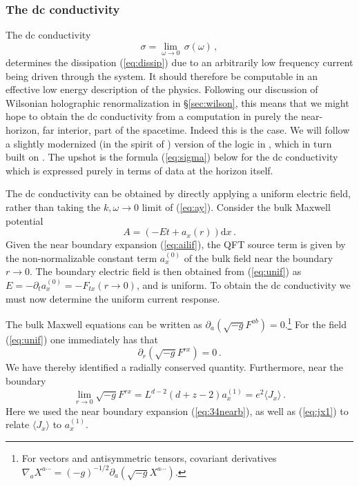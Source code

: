 \documentclass[10pt, oneside]{book}
\let\pa=\partial
\def\be{\begin{equation}}
\def\ee{\end{equation}}
\begin{document}
\begin{doublespace}
\subsubsection{The dc conductivity}
\label{sec:dccond}

The dc conductivity
\be
\sigma = \lim_{\omega \to 0} \, \sigma(\omega) \,,
\ee
determines the dissipation (\ref{eq:dissip}) due to an arbitrarily low frequency current being driven through the system. It should therefore be computable in an effective low energy description of the physics. Following our discussion of Wilsonian holographic renormalization in \S\ref{sec:wilson}, this means that we might hope to obtain the dc conductivity from a computation in purely the near-horizon, far interior, part of the spacetime. Indeed this is the case. We will follow a slightly modernized (in the spirit of \cite{Donos:2014yya}) version of the logic in \cite{Iqbal:2008by}, which in turn built on \cite{Kovtun:2003wp}. The upshot is the formula (\ref{eq:sigma}) below for the dc conductivity which is expressed purely in terms of data at the horizon itself.

 

The dc conductivity can be obtained by directly applying a uniform electric field, rather than taking the $k,\omega \to 0$ limit of (\ref{eq:ay}). Consider the bulk Maxwell potential
\be\label{eq:unif}
A = (-Et + a_x(r)) \mathrm{d}x \,.
\ee
Given the near boundary expansion (\ref{eq:ailif}), the QFT source term is given by the non-normalizable constant term $a_x^{(0)}$ of the bulk field near the boundary $r \to 0$.   The boundary electric field is then obtained from (\ref{eq:unif}) as $E = - \pa_t a_x^{(0)} = - F_{tx}(r\rightarrow 0)$, and is uniform.
To obtain the dc conductivity we must now determine the uniform current response.

The bulk Maxwell equations can be written as $\partial_a(\sqrt{-g} F^{ab})=0$.\footnote{For vectors and antisymmetric tensors, covariant derivatives $\nabla_a X^{a\cdots} =  (-g)^{-1/2} \partial_a ( \sqrt{-g} X^{a\cdots})$.}   For the field (\ref{eq:unif}) one immediately has that
\be\label{eq:Jcons}
\pa_r \left( \sqrt{-g} F^{rx} \right) = 0 \,.
\ee
We have thereby identified a radially conserved quantity. Furthermore, near the boundary
\be\label{eq:Jbdy}
\lim_{r \to 0} \sqrt{-g} F^{rx} = L^{d-2} (d+z-2)a_x^{(1)} = e^2 \langle J_x\rangle \,.
\ee
Here we used the near boundary expansion (\ref{eq:34nearb}), as well as (\ref{eq:jx1}) to relate $\langle J_x\rangle$ to $a_x^{(1)}$.


\end{doublespace}
\end{document}
